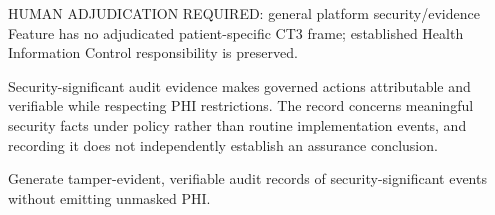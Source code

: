 HUMAN ADJUDICATION REQUIRED: general platform security/\allowbreak{}evidence Feature has no adjudicated patient-specific CT3 frame; established Health Information Control responsibility is preserved.



Security-significant audit evidence makes governed actions attributable and verifiable while respecting PHI restrictions. The record concerns meaningful security facts under policy rather than routine implementation events, and recording it does not independently establish an assurance conclusion.



Generate tamper-evident, verifiable audit records of security-significant events without emitting unmasked PHI.


